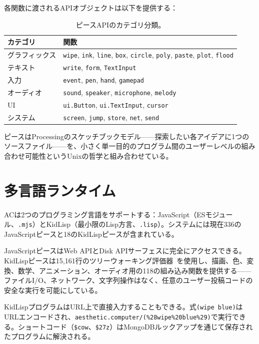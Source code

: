\documentclass[10pt,letterpaper,twocolumn]{article}
\begin{document}
各関数に渡されるAPIオブジェクトは以下を提供する：

\begin{table}[h]
\small
\centering
\begin{tabularx}{\columnwidth}{lX}
\toprule
\textbf{カテゴリ} & \textbf{関数} \\
\midrule
グラフィックス & \texttt{wipe}, \texttt{ink}, \texttt{line}, \texttt{box}, \texttt{circle}, \texttt{poly}, \texttt{paste}, \texttt{plot}, \texttt{flood} \\
テキスト & \texttt{write}, \texttt{form}, \texttt{TextInput} \\
入力 & \texttt{event}, \texttt{pen}, \texttt{hand}, \texttt{gamepad} \\
オーディオ & \texttt{sound}, \texttt{speaker}, \texttt{microphone}, \texttt{melody} \\
UI & \texttt{ui.Button}, \texttt{ui.TextInput}, \texttt{cursor} \\
システム & \texttt{screen}, \texttt{jump}, \texttt{store}, \texttt{net}, \texttt{send} \\
\bottomrule
\end{tabularx}
\caption{ピースAPIのカテゴリ分類。}
\label{tab:api}
\end{table}

ピースはProcessingのスケッチブックモデル——探索したい各アイデアに1つのソースファイル——を、小さく単一目的のプログラム間のユーザーレベルの組み合わせ可能性というUnixの哲学と組み合わせている。


\section{多言語ランタイム}
\label{sec:languages}

ACは2つのプログラミング言語をサポートする：JavaScript（ESモジュール、\texttt{.mjs}）とKidLisp（最小限のLisp方言、\texttt{.lisp}）。システムには現在336のJavaScriptピースと18のKidLispピースが含まれている。

JavaScriptピースはWeb APIとDisk APIサーフェスに完全にアクセスできる。KidLispピースは15,161行のツリーウォーキング評価器~\citep{scudder2026kidlisp}を使用し、描画、色、変換、数学、アニメーション、オーディオ用の118の組み込み関数を提供する——ファイルI/O、ネットワーク、文字列操作はなく、任意のユーザー投稿コードの安全な実行を可能にしている。

KidLispプログラムはURL上で直接入力することもできる。式\texttt{(wipe blue)}はURLエンコードされ、\texttt{aesthetic.computer/(\%28wipe\%20blue\%29)}で実行できる。ショートコード（\texttt{\$cow}、\texttt{\$27z}）はMongoDBルックアップを通じて保存されたプログラムに解決される。
\end{document}
